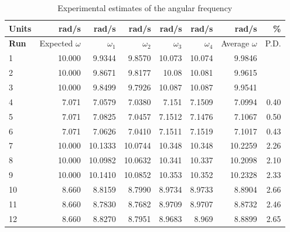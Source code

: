 \begin{table}[ht]
    \centering
    \begin{tabular}{l|r|r|r|r|r|r|r}
        \textbf{Units} & rad/s & rad/s & rad/s & rad/s & rad/s & rad/s & \% \\
        \hline
        \textbf{Run} & Expected $\omega$ & $\omega_{1}$ & $\omega_{2}$ & $\omega_{3}$ & $\omega_{4}$ & Average $\omega$ & P.D. \\
        \hline
        1 & 10.000 & 9.9344 & 9.8570 & 10.073 & 10.074 & 9.9846 & \textminus 0.15 \\
        2 & 10.000 & 9.8671 & 9.8177 & 10.08 & 10.081 & 9.9615 & \textminus 0.39 \\
        3 & 10.000 & 9.8499 & 9.7926 & 10.087 & 10.087 & 9.9541 & \textminus 0.46 \\
        \hline
        4 & 7.071 & 7.0579 & 7.0380 & 7.151 & 7.1509 & 7.0994 & 0.40 \\
        5 & 7.071 & 7.0825 & 7.0457 & 7.1512 & 7.1476 & 7.1067 & 0.50 \\
        6 & 7.071 & 7.0626 & 7.0410 & 7.1511 & 7.1519 & 7.1017 & 0.43 \\
        \hline
        7 & 10.000 & 10.1333 & 10.0744 & 10.348 & 10.348 & 10.2259 & 2.26 \\
        8 & 10.000 & 10.0982 & 10.0632 & 10.341 & 10.337 & 10.2098 & 2.10 \\
        9 & 10.000 & 10.1410 & 10.0852 & 10.353 & 10.352 & 10.2328 & 2.33 \\
        \hline
        10 & 8.660 & 8.8159 & 8.7990 & 8.9734 & 8.9733 & 8.8904 & 2.66 \\
        11 & 8.660 & 8.7830 & 8.7682 & 8.9709 & 8.9707 & 8.8732 & 2.46 \\
        12 & 8.660 & 8.8270 & 8.7951 & 8.9683 & 8.969 & 8.8899 & 2.65 \\
        \hline
    \end{tabular}
    \caption{Experimental estimates of the angular frequency}
    \label{table.11.omega}
\end{table}
%
\FloatBarrier
\newpage
